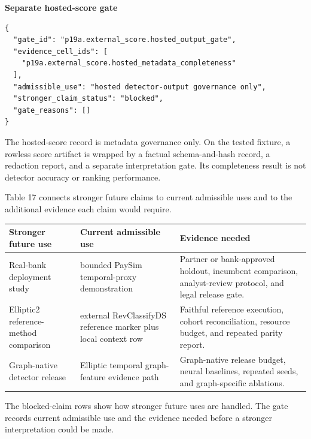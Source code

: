 \documentclass[11pt]{article}
\begin{document}
\textbf{Separate hosted-score gate}

\begin{Verbatim}[frame=single,framesep=6pt,fontsize=\footnotesize,breaklines=true,breakanywhere=true]
{
  "gate_id": "p19a.external_score.hosted_output_gate",
  "evidence_cell_ids": [
    "p19a.external_score.hosted_metadata_completeness"
  ],
  "admissible_use": "hosted detector-output governance only",
  "stronger_claim_status": "blocked",
  "gate_reasons": []
}
\end{Verbatim}


The hosted-score record is metadata governance only. On the tested fixture, a rowless score artifact is wrapped by a factual schema-and-hash record, a redaction report, and a separate interpretation gate. Its completeness result is not detector accuracy or ranking performance.

Table 17 connects stronger future claims to current admissible uses and to the additional evidence each claim would require.

\begin{center}
\begin{minipage}{\linewidth}
\small
\setlength{\tabcolsep}{3pt}
\renewcommand{\arraystretch}{1.16}
\begin{tabularx}{\linewidth}{@{}>{\raggedright\arraybackslash}X >{\raggedright\arraybackslash}X >{\raggedright\arraybackslash}X@{}}
\toprule
Stronger future use & Current admissible use & Evidence needed \\
\midrule
Real-bank deployment study & bounded PaySim temporal-proxy demonstration & Partner or bank-approved holdout, incumbent comparison, analyst-review protocol, and legal release gate. \\
Elliptic2 reference-method comparison & external RevClassifyDS reference marker plus local context row & Faithful reference execution, cohort reconciliation, resource budget, and repeated parity report. \\
Graph-native detector release & Elliptic temporal graph-feature evidence path & Graph-native release budget, neural baselines, repeated seeds, and graph-specific ablations. \\
\bottomrule
\end{tabularx}
\end{minipage}
\end{center}


The blocked-claim rows show how stronger future uses are handled. The gate records current admissible use and the evidence needed before a stronger interpretation could be made.
\end{document}
